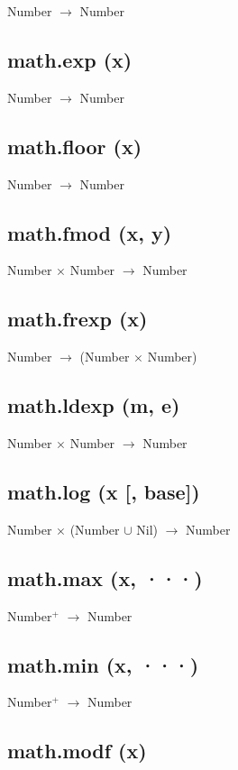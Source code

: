 \documentclass[12pt]{article}
\begin{document}
Number $\rightarrow$ Number

\subsection{math.exp (x)}

Number $\rightarrow$ Number

\subsection{math.floor (x)}

Number $\rightarrow$ Number

\subsection{math.fmod (x, y)}

Number $\times$ Number $\rightarrow$ Number

\subsection{math.frexp (x)}

Number $\rightarrow$ (Number $\times$ Number)

\subsection{math.ldexp (m, e)}

Number $\times$ Number $\rightarrow$ Number

\subsection{math.log (x [, base])}

Number $\times$
(Number $\cup$ Nil) $\rightarrow$
Number

\subsection{math.max (x, ···)}

Number$^+$ $\rightarrow$ Number

\subsection{math.min (x, ···)}

Number$^+$ $\rightarrow$ Number

\subsection{math.modf (x)}
\end{document}
